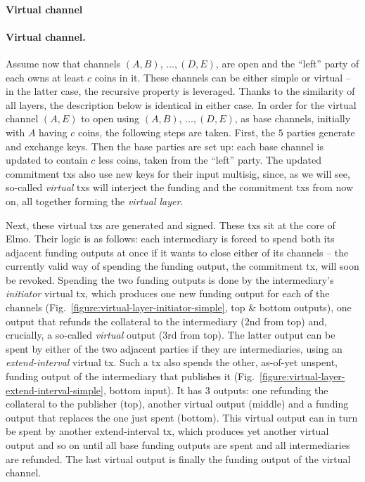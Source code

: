   \makeatletter%
    {\paragraph{Virtual channel}}%
    {\paragraph{Virtual channel.}}%
  \makeatother%
  Assume now that channels $(A, B)$, $\dots,(D, E)$, are open and the ``left''
  party of each owns at least $c$ coins in it. These channels can be either
  simple or virtual -- in the latter case, the recursive property is leveraged.
  Thanks to the similarity of all layers, the description below is identical in
  either case. In order for the virtual channel $(A, E)$ to open using $(A, B)$,
  $\dots,(D, E)$, as base channels, initially with $A$ having $c$ coins, the
  following
  steps are taken. First, the $5$ parties generate and exchange keys. Then the
  base parties are set up: each base channel is updated to contain $c$ less
  coins, taken from the ``left'' party. The updated commitment txs also use new
  keys for their input multisig, since, as we will see, so-called \emph{virtual}
  txs will interject the funding and the commitment txs from now on, all
  together forming the \emph{virtual layer}.

  Next, these virtual txs are generated and signed. These txs sit at the core of
  Elmo. Their logic is as follows: each intermediary is forced to spend both its
  adjacent funding outputs at once if it wants to close either of its channels
  -- the currently valid way of spending the funding output, the commitment tx,
  will soon be revoked. Spending the two funding outputs is done by the
  intermediary's \emph{initiator} virtual tx, which produces one new funding
  output for each of the channels
  (Fig.~\ref{figure:virtual-layer-initiator-simple}, top \& bottom outputs), one
  output that refunds the collateral to the intermediary ($2$nd from top) and,
  crucially, a so-called \emph{virtual} output ($3$rd from top). The latter
  output can be spent by either of the two adjacent parties if they are
  intermediaries, using an \emph{extend-interval} virtual tx. Such a tx also
  spends the other, as-of-yet unspent, funding output of the intermediary that
  publishes it (Fig.~\ref{figure:virtual-layer-extend-interval-simple}, bottom
  input). It has $3$ outputs: one refunding the collateral to the publisher
  (top), another virtual output (middle) and a funding output that replaces the
  one just spent (bottom). This virtual output can in turn be spent by another
  extend-interval tx, which produces yet another virtual output and so on until
  all base funding outputs are spent and all intermediaries are refunded. The
  last virtual output is finally the funding output of the virtual channel.

